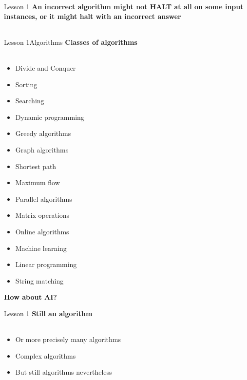 \documentclass[aspectratio=1610]{beamer}
\begin{document}
\begin{frame}{Lesson 1}{}
\LARGE
\textbf {An incorrect algorithm might not HALT at all on some input instances, or it might halt with an incorrect answer\\~\\}
\end{frame}



\begin{frame}{Lesson 1}{Algorithms}
\Large
\textbf{Classes of algorithms}\\~\\ 
    \begin{multicols}{3}
    \begin{itemize}
        \item Divide and Conquer
        \item Sorting
        \item Searching
        \item Dynamic programming
        \item Greedy algorithms
        \item Graph algorithms
        \item Shortest path
        \item Maximum flow
        \item Parallel algorithms
        \item Matrix operations
        \item Online algorithms
        \item Machine learning
        \item Linear programming
        \item String matching
    \end{itemize}
    \end{multicols}
\end{frame}


\begin{frame}
\begin{center}
\Huge 
\textbf { How about AI? }
\end{center}
\end{frame}


\begin{frame}{Lesson 1}{}
\LARGE
\textbf {Still an algorithm\\~\\}
\begin{itemize}
    \item Or more precisely many algorithms
    \item Complex algorithms
    \item But still algorithms nevertheless 
 \end{itemize}
\end{frame}
\end{document}
